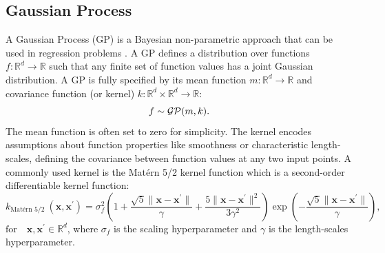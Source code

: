 \documentclass[preprint,12pt]{elsarticle}
\begin{document}
\subsection{Gaussian Process}

A Gaussian Process (GP) is a Bayesian non-parametric approach that can be used in regression problems \citep{refWilliams2006}. A GP defines a distribution over functions $f:\mathbb{R}^d\to\mathbb{R}$ such that any finite set of function values has a joint Gaussian distribution. A GP is fully specified by its mean function $m:\mathbb{R}^d\to\mathbb{R}$ and covariance function (or kernel) $k:\mathbb{R}^d\times\mathbb{R}^d\to\mathbb{R}$:
\begin{equation}
    f\sim \mathcal{GP}(m, k).\notag
\end{equation}
The mean function is often set to zero for simplicity. The kernel encodes assumptions about function properties like smoothness or characteristic length-scales, defining the covariance between function values at any two input points. A commonly used kernel is the Matérn 5/2 kernel function which is a second-order differentiable kernel function: 
$$k_\text{Matérn 5/2 }(\mathbf{x,x^\prime})=\sigma_f^2\left(1+\frac{\sqrt{5}\|\mathbf{x}-\mathbf{x}^\prime\|}{\gamma}+\frac{5\|\mathbf{x}-\mathbf{x}^\prime\|^2}{3\gamma^2}\right)\exp\left(-\frac{\sqrt{5}\|\mathbf x- \mathbf{x}^\prime\|}{\gamma}\right),$$
$\text{for}\quad \mathbf{x,x^\prime}\in\mathbb{R}^d$,
where $\sigma_f$ is the scaling hyperparameter and $\gamma$ is the length-scales hyperparameter.
\end{document}

